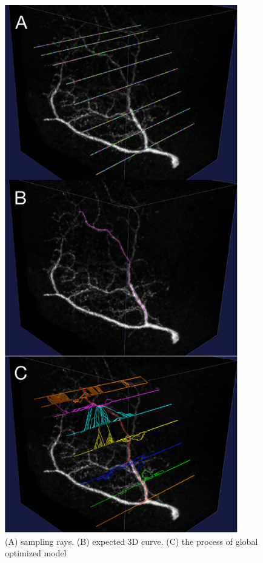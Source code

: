 \begin{figure}[htb]
\begin{center}
\includegraphics[width=4in]{images/fm_dynamic_drawing}
\caption{(A) sampling rays. (B) expected 3D curve. (C) the process of global optimized model}
\label{fig:fm-dynamic-drawing}
\end{center}
\end{figure}

